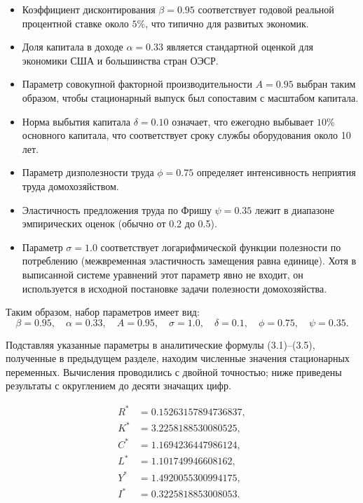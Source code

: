\documentclass[12pt,a4paper]{report}   %
\begin{document}
            \begin{itemize}
                \item Коэффициент дисконтирования $\beta = 0.95$ соответствует годовой реальной процентной ставке около $5\%$, что типично для развитых экономик.
                \item Доля капитала в доходе $\alpha = 0.33$ является стандартной оценкой для экономики США и большинства стран ОЭСР.
                \item Параметр совокупной факторной производительности $A = 0.95$ выбран таким образом, чтобы стационарный выпуск был сопоставим с масштабом капитала.
                \item Норма выбытия капитала $\delta = 0.10$ означает, что ежегодно выбывает $10\%$ основного капитала, что соответствует сроку службы оборудования около 10 лет.
                \item Параметр дизполезности труда $\phi = 0.75$ определяет интенсивность неприятия труда домохозяйством.
                \item Эластичность предложения труда по Фришу $\psi = 0.35$ лежит в диапазоне эмпирических оценок (обычно от 0.2 до 0.5).
                \item Параметр $\sigma = 1.0$ соответствует логарифмической функции полезности по потреблению (межвременная эластичность замещения равна единице). Хотя в выписанной системе уравнений этот параметр явно не входит, он используется в исходной постановке задачи полезности домохозяйства.
            \end{itemize}

            Таким образом, набор параметров имеет вид:
            \[
            \beta = 0.95,\quad \alpha = 0.33,\quad A = 0.95,\quad \sigma = 1.0,\quad \delta = 0.1,\quad \phi = 0.75,\quad \psi = 0.35.
            \]


            Подставляя указанные параметры в аналитические формулы (3.1)–(3.5), полученные в предыдущем разделе, находим численные значения стационарных переменных. Вычисления проводились с двойной точностью; ниже приведены результаты с округлением до десяти значащих цифр.

            \begin{align}
            R^* &= 0.15263157894736837, \\
            K^* &= 3.2258188530080525, \\
            C^* &= 1.1694236447986124, \\
            L^* &= 1.101749946608162, \\
            Y^* &= 1.4920055300994175, \\
            I^* &= 0.3225818853008053.
            \end{align}
\end{document}
